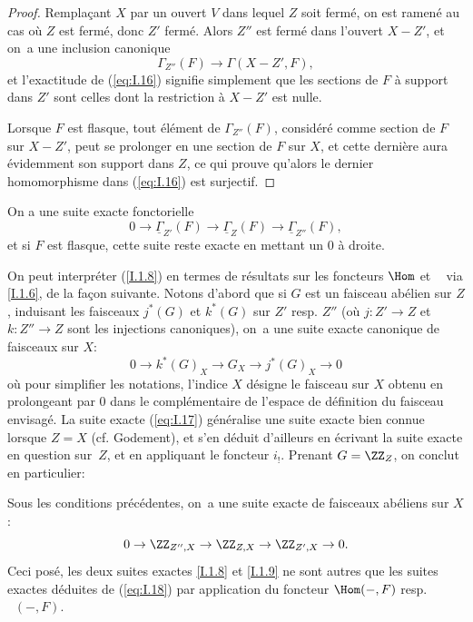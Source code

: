 \begin{proof}
Rempla\c cant $X$ par un ouvert $V$ dans lequel $Z$ soit ferm\'e, on
est ramen\'e au cas o\`u $Z$ est ferm\'e, donc $Z'$ ferm\'e. Alors $Z''$
est ferm\'e dans l'ouvert $X-Z'$, et on~a une inclusion canonique
$$
\Gamma_{Z''}(F) \to \Gamma(X-Z', F),
$$
et l'exactitude de (\ref{eq:I.16}) signifie simplement que les sections de $F$ \`a support dans $Z'$ sont celles dont la restriction \`a $X-Z'$ est nulle.

Lorsque $F$ est flasque, tout \'el\'ement de $\Gamma_{Z''}(F)$, consid\'er\'e comme section de $F$ sur $X-Z'$, peut se prolonger en une section de $F$ sur $X$, et cette derni\`ere aura \'evidemment son support dans $Z$, ce qui prouve qu'alors le dernier homomorphisme dans (\ref{eq:I.16}) est surjectif.
\skipqed
\end{proof}

\begin{corollaire} \label{I.1.9} On a une suite exacte fonctorielle
\begin{equation*} \label{eq:I.16bis} \tag{16 bis} {0 \to \underline{\Gamma}_{Z'}(F) \to \underline{\Gamma}_Z(F) \to \underline{\Gamma}_{Z''}(F)},
\end{equation*}
et si $F$ est flasque, cette suite reste exacte en mettant un $0$ \`a droite.
\end{corollaire}

On peut interpr\'eter (\ref{I.1.8}) en termes de r\'esultats sur les
foncteurs $\Hom$ et $\mathop{\underline{\mathrm{Hom}}}\nolimits$ via \ref{I.1.6}, de la fa\c con
suivante. Notons d'abord que si $G$ est un faisceau ab\'elien sur
$Z$, induisant les faisceaux $j^*(G)$ et $k^*(G)$ sur $Z'$ resp.
$Z''$ (o\`u $j: Z' \to Z$ et $k: Z'' \to Z$ sont les injections
canoniques), on~a une suite exacte canonique de faisceaux sur $X$:
\begin{equation} \label{eq:I.17} {0 \to k^*(G)_X \to G_X \to j^*(G)_X \to 0}
\end{equation}
o\`u pour simplifier les notations, l'indice $X$ d\'esigne le faisceau sur $X$ obtenu en prolongeant par $0$ dans le compl\'ementaire de l'espace de d\'efinition du faisceau envisag\'e. La suite exacte (\ref{eq:I.17}) g\'en\'eralise une suite exacte bien connue lorsque $Z=X$ (cf. Godement), et s'en d\'eduit d'ailleurs en \'ecrivant la suite exacte en question sur~$Z$, et en appliquant le foncteur $i_!$. Prenant $G=\ZZ_{Z}$, on conclut en particulier:

\begin{proposition} \label{I.1.10}
Sous les conditions pr\'ec\'edentes, on~a une suite exacte de faisceaux ab\'eliens sur $X$:
\begin{equation} \label{eq:I.18} {0 \to \ZZ_{Z{''}, X} \to \ZZ_{Z, X} \to \ZZ_{Z', X} \to 0}.
\end{equation}
Ceci pos\'e, les deux suites exactes \ref{I.1.8} et \ref{I.1.9} ne sont autres que les suites exactes d\'eduites de (\ref{eq:I.18}) par application du foncteur $\Hom(-, F)$ resp. $\mathop{\underline{\mathrm{Hom}}}\nolimits(-, F)$.
\end{proposition}

